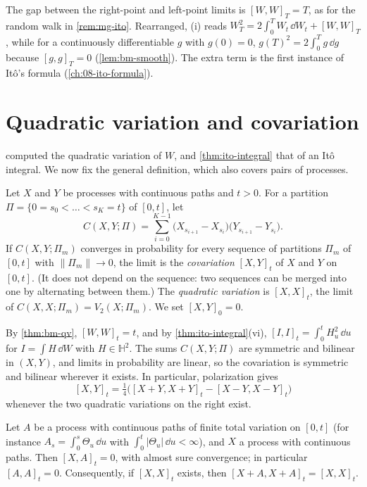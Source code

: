 The gap between the right-point and left-point limits is $[W,W]_T=T$, as for the random walk
in \cref{rem:mg-ito}. Rearranged, (i) reads $W_T^2=2\int_0^TW_t\,\dd W_t+[W,W]_T$, while for a
continuously differentiable $g$ with $g(0)=0$, $g(T)^2=2\int_0^Tg\,\dd g$ because $[g,g]_T=0$
(\cref{lem:bm-smooth}). The extra term is the first instance of It\^o's formula
(\cref{ch:08-ito-formula}).


\section{Quadratic variation and covariation}\label{sec:ito-qv}

 computed the quadratic variation of $W$, and \cref{thm:ito-integral} that of
an It\^o integral. We now fix the general definition, which also covers pairs of processes.

\begin{definition}\label{def:ito-covariation}
Let $X$ and $Y$ be processes with continuous paths and $t>0$. For a partition
$\Pi=\{0=s_0<\dots<s_K=t\}$ of $[0,t]$, let
\[
  C(X,Y;\Pi)=\sum_{i=0}^{K-1}\big(X_{s_{i+1}}-X_{s_i}\big)\big(Y_{s_{i+1}}-Y_{s_i}\big).
\]
If $C(X,Y;\Pi_m)$ converges in probability for every sequence of partitions $\Pi_m$ of
$[0,t]$ with $\|\Pi_m\|\to0$, the limit is the \emph{covariation} $[X,Y]_t$ of $X$ and $Y$ on
$[0,t]$. (It does not depend on the sequence: two sequences can be merged into one by
alternating between them.) The \emph{quadratic variation} is $[X,X]_t$, the limit of
$C(X,X;\Pi_m)=V_2(X;\Pi_m)$. We set $[X,Y]_0=0$.
\end{definition}

By \cref{thm:bm-qv}, $[W,W]_t=t$, and by \cref{thm:ito-integral}(vi),
$[I,I]_t=\int_0^tH_u^2\,\dd u$ for $I=\int H\,\dd W$ with $H\in\mathbb H^2$. The sums
$C(X,Y;\Pi)$ are symmetric and bilinear in $(X,Y)$, and limits in probability are linear, so
the covariation is symmetric and bilinear wherever it exists. In particular, polarization
gives
\[
  [X,Y]_t=\tfrac14\big([X+Y,X+Y]_t-[X-Y,X-Y]_t\big)
\]
whenever the two quadratic variations on the right exist.

\begin{lemma}\label{lem:ito-fv}
Let $A$ be a process with continuous paths of finite total variation on $[0,t]$ (for
instance $A_s=\int_0^s\Theta_u\,\dd u$ with $\int_0^t|\Theta_u|\,\dd u<\infty$), and $X$ a
process with continuous paths. Then $[X,A]_t=0$, with almost sure convergence; in particular
$[A,A]_t=0$. Consequently, if $[X,X]_t$ exists, then $[X+A,X+A]_t=[X,X]_t$.
\end{lemma}

